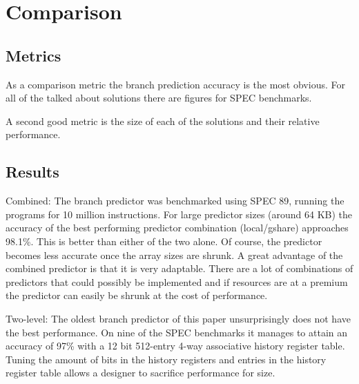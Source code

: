 
\section{Comparison}
\subsection{Metrics}
As a comparison metric the branch prediction accuracy is the most obvious.
For all of the talked about solutions there are figures for SPEC benchmarks.

A second good metric is the size of each of the solutions and their relative performance.
\subsection{Results}




Combined:
The branch predictor was benchmarked using SPEC 89, running the programs for 10 million instructions. For large predictor sizes (around 64 KB) the accuracy of the best performing predictor combination (local/gshare) approaches 98.1\%. This is better than either of the two alone. Of course, the predictor becomes less accurate once the array sizes are shrunk. A great advantage of the combined predictor is that it is very adaptable. There are a lot of combinations of predictors that could possibly be implemented and if resources are at a premium the predictor can easily be shrunk at the cost of performance.

Two-level:
The oldest branch predictor of this paper unsurprisingly does not have the best performance. On nine of the SPEC benchmarks it manages to attain an accuracy of 97\% with a 12 bit 512-entry 4-way associative history register table. Tuning the amount of bits in the history registers and entries in the history register table allows a designer to sacrifice performance for size.
